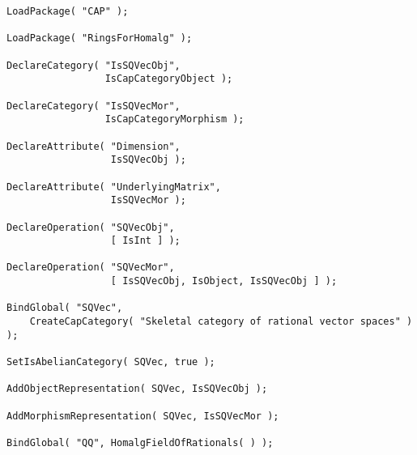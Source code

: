 \begin{small}
\begin{Verbatim}[frame=single]
LoadPackage( "CAP" );

LoadPackage( "RingsForHomalg" );

DeclareCategory( "IsSQVecObj",
                 IsCapCategoryObject );

DeclareCategory( "IsSQVecMor",
                 IsCapCategoryMorphism );

DeclareAttribute( "Dimension",
                  IsSQVecObj );

DeclareAttribute( "UnderlyingMatrix", 
                  IsSQVecMor );

DeclareOperation( "SQVecObj",
                  [ IsInt ] );

DeclareOperation( "SQVecMor",
                  [ IsSQVecObj, IsObject, IsSQVecObj ] );

BindGlobal( "SQVec", 
    CreateCapCategory( "Skeletal category of rational vector spaces" ) );

SetIsAbelianCategory( SQVec, true );

AddObjectRepresentation( SQVec, IsSQVecObj );

AddMorphismRepresentation( SQVec, IsSQVecMor );

BindGlobal( "QQ", HomalgFieldOfRationals( ) );
\end{Verbatim}
\end{small}
